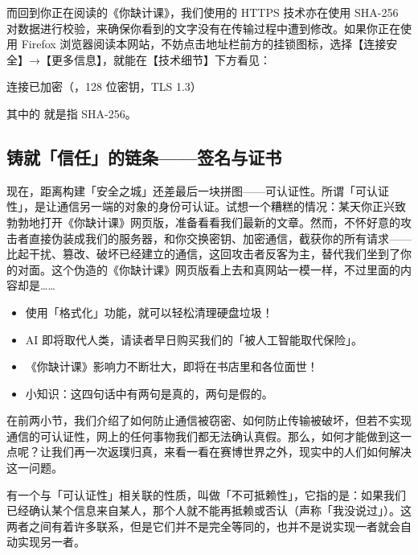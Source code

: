 而回到你正在阅读的《你缺计课》，我们使用的 HTTPS 技术亦在使用 SHA-256 对数据进行校验，来确保你看到的文字没有在传输过程中遭到修改。如果你正在使用 Firefox 浏览器阅读本网站，不妨点击地址栏前方的挂锁图标，选择【连接安全】→【更多信息】，就能在【技术细节】下方看见：

\begin{quoting}
  连接已加密（，128 位密钥，TLS 1.3）
\end{quoting}

其中的  就是指 SHA-256。

\subsection{铸就「信任」的链条——签名与证书}

现在，距离构建「安全之城」还差最后一块拼图——可认证性。所谓「可认证性」，是让通信另一端的对象的身份可认证。试想一个糟糕的情况：某天你正兴致勃勃地打开《你缺计课》网页版，准备看看我们最新的文章。然而，不怀好意的攻击者直接伪装成我们的服务器，和你交换密钥、加密通信，截获你的所有请求——比起干扰、篡改、破坏已经建立的通信，这回攻击者反客为主，替代我们坐到了你的对面。这个伪造的《你缺计课》网页版看上去和真网站一模一样，不过里面的内容却是……
\vspace*{-1ex}

\begin{quoting}
  \begin{itemize}
    \item 使用「格式化」功能，就可以轻松清理硬盘垃圾！
    \item AI 即将取代人类，请读者早日购买我们的「被人工智能取代保险」。
    \item 《你缺计课》影响力不断壮大，即将在书店里和各位面世！
    \item 小知识：这四句话中有两句是真的，两句是假的。
  \end{itemize}
\end{quoting}

\vspace*{-1ex}
在前两小节，我们介绍了如何防止通信被窃密、如何防止传输被破坏，但若不实现通信的可认证性，网上的任何事物我们都无法确认真假。那么，如何才能做到这一点呢？让我们再一次返璞归真，来看一看在赛博世界之外，现实中的人们如何解决这一问题。

\begin{note}
  有一个与「可认证性」相关联的性质，叫做「不可抵赖性」，它指的是：如果我们已经确认某个信息来自某人，那个人就不能再抵赖或否认（声称「我没说过」）。这两者之间有着许多联系，但是它们并不是完全等同的，也并不是说实现一者就会自动实现另一者。
\end{note}

